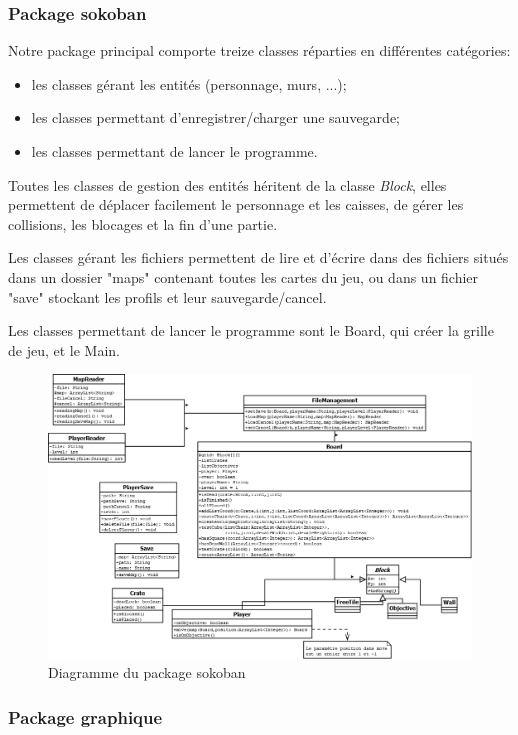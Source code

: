 \documentclass[a4paper,12pt]{article} %
\begin{document}
\subsubsection{Package sokoban}

Notre package principal comporte treize classes réparties en différentes catégories:
\begin{itemize}
\item les classes gérant les entités (personnage, murs, ...);
\item les classes permettant d'enregistrer/charger une sauvegarde;
\item les classes permettant de lancer le programme.
\end{itemize}

Toutes les classes de gestion des entités héritent de la classe \textit{Block}, elles permettent de déplacer facilement le personnage et les caisses, de gérer les collisions, les blocages et la fin d'une partie.

Les classes gérant les fichiers permettent de lire et d'écrire dans des fichiers situés dans un dossier "maps" contenant toutes les cartes du jeu, ou dans un fichier "save" stockant les profils et leur sauvegarde/cancel.

Les classes permettant de lancer le programme sont le Board, qui créer la grille de jeu, et le Main.

\begin{figure}[!h]
\centering
\includegraphics[scale=0.3]{images/diag_sokoban.png}
\caption{Diagramme du package sokoban}
\end{figure}

\subsubsection{Package graphique}
\end{document}
